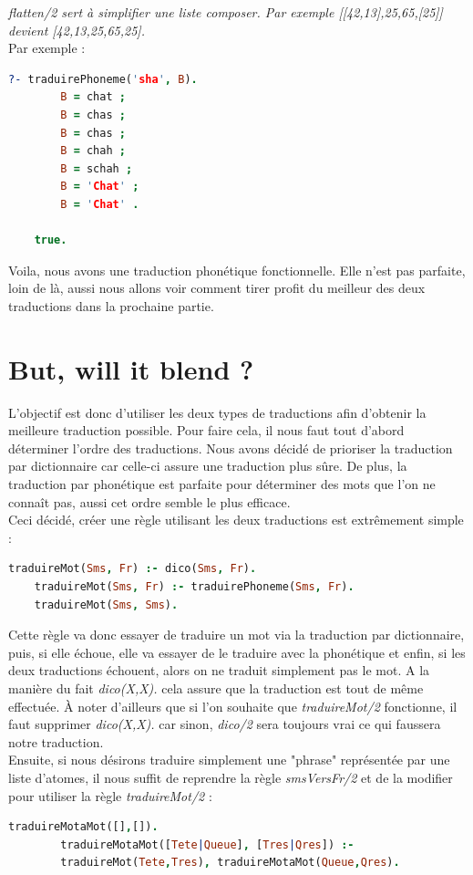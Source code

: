 \documentclass[11pt]{report}
\begin{document}
	{\em flatten/2 sert à simplifier une liste composer. Par exemple [[42,13],25,65,[25]] devient [42,13,25,65,25].}\\
	
	Par exemple :
	\begin{lstlisting}[language=Prolog]
	?- traduirePhoneme('sha', B).
		B = chat ;
		B = chas ;
		B = chas ;
		B = chah ;
		B = schah ;
		B = 'Chat' ;
		B = 'Chat' .
		
	true.
	\end{lstlisting}
	
	Voila, nous avons une traduction phonétique fonctionnelle. Elle n'est pas parfaite, loin de là, aussi nous allons voir comment tirer profit du meilleur des deux traductions dans la prochaine partie.
	
	\section{But, will it blend ?}
	
	L'objectif est donc d'utiliser les deux types de traductions afin d'obtenir la meilleure traduction possible. Pour faire cela, il nous faut tout d'abord déterminer l'ordre des traductions. Nous avons décidé de prioriser la traduction par dictionnaire car celle-ci assure une traduction plus sûre. De plus, la traduction par phonétique est parfaite pour déterminer des mots que l'on ne connaît pas, aussi cet ordre semble le plus efficace.\\
	Ceci décidé, créer une règle utilisant les deux traductions est extrêmement simple :
	\begin{lstlisting}[language=Prolog]
	traduireMot(Sms, Fr) :- dico(Sms, Fr).
	traduireMot(Sms, Fr) :- traduirePhoneme(Sms, Fr).
	traduireMot(Sms, Sms).
	\end{lstlisting}
	
	Cette règle va donc essayer de traduire un mot via la traduction par dictionnaire, puis, si elle échoue, elle va essayer de le traduire avec la phonétique et enfin, si les deux traductions échouent, alors on ne traduit simplement pas le mot. A la manière du fait {\em dico(X,X).} cela assure que la traduction est tout de même effectuée. À noter d'ailleurs que si l'on souhaite que {\em traduireMot/2} fonctionne, il faut supprimer {\em dico(X,X).} car sinon, {\em dico/2} sera toujours vrai ce qui faussera notre traduction.\\
	
	Ensuite, si nous désirons traduire simplement une "phrase" représentée par une liste d'atomes, il nous suffit de reprendre la règle {\em smsVersFr/2} et de la modifier pour utiliser la règle {\em traduireMot/2} :
	\begin{lstlisting}[language=Prolog]
	traduireMotaMot([],[]).
		traduireMotaMot([Tete|Queue], [Tres|Qres]) :-
		traduireMot(Tete,Tres), traduireMotaMot(Queue,Qres).
	\end{lstlisting}
	
\end{document}
